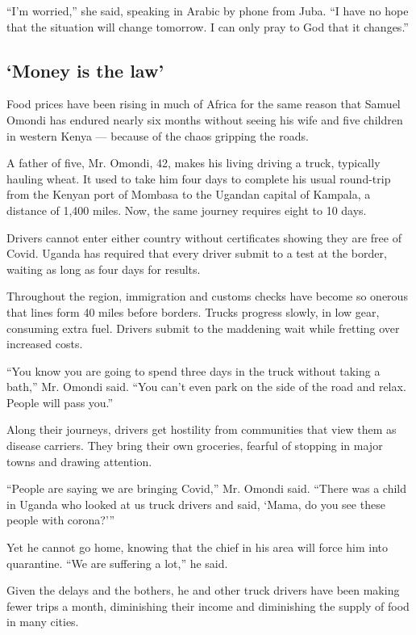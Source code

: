 ``I'm worried,'' she said, speaking in Arabic by phone from Juba. ``I
have no hope that the situation will change tomorrow. I can only pray to
God that it changes.''

\hypertarget{money-is-the-law}{%
\subsection{`Money is the law'}\label{money-is-the-law}}

Food prices have been rising in much of Africa for the same reason that
Samuel Omondi has endured nearly six months without seeing his wife and
five children in western Kenya --- because of the chaos gripping the
roads.

A father of five, Mr. Omondi, 42, makes his living driving a truck,
typically hauling wheat. It used to take him four days to complete his
usual round-trip from the Kenyan port of Mombasa to the Ugandan capital
of Kampala, a distance of 1,400 miles. Now, the same journey requires
eight to 10 days.

Drivers cannot enter either country without certificates showing they
are free of Covid. Uganda has required that every driver submit to a
test at the border, waiting as long as four days for results.

Throughout the region, immigration and customs checks have become so
onerous that lines form 40 miles before borders. Trucks progress slowly,
in low gear, consuming extra fuel. Drivers submit to the maddening wait
while fretting over increased costs.

``You know you are going to spend three days in the truck without taking
a bath,'' Mr. Omondi said. ``You can't even park on the side of the road
and relax. People will pass you.''

Along their journeys, drivers get hostility from communities that view
them as disease carriers. They bring their own groceries, fearful of
stopping in major towns and drawing attention.

``People are saying we are bringing Covid,'' Mr. Omondi said. ``There
was a child in Uganda who looked at us truck drivers and said, `Mama, do
you see these people with corona?'''

Yet he cannot go home, knowing that the chief in his area will force him
into quarantine. ``We are suffering a lot,'' he said.

Given the delays and the bothers, he and other truck drivers have been
making fewer trips a month, diminishing their income and diminishing the
supply of food in many cities.


